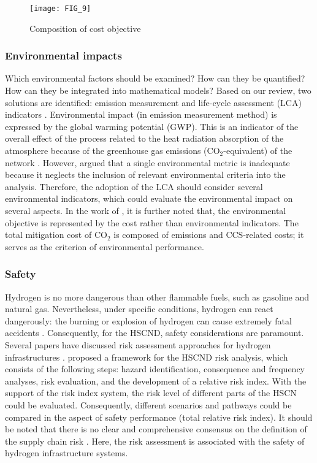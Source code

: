 \documentclass[11pt,3p]{elsarticle}
\begin{document}
\begin{figure}[!htbp]
\centering\texttt{[image: FIG\_9]}
\caption{\label{fig:CompositionCost}Composition of cost objective}
\end{figure}

\subsubsection{Environmental impacts}

Which environmental factors should be examined? How can they be quantified? How can they be integrated into mathematical models? Based on our review, two solutions are identified: emission measurement \citep{almaraz2013assessment,almaraz2014hydrogen,almaraz2015deployment,han2013multi} and life-cycle assessment (LCA) indicators \citep{guillen2010bi,sabio2012holistic}. Environmental impact (in emission measurement method) is expressed by the global warming potential (GWP). This is an indicator of the overall effect of the process related to the heat radiation absorption of the atmosphere because of the greenhouse gas emissions (CO$_{2}$-equivalent) of the network \citep{almaraz2013assessment}. However, \citet{sabio2012holistic} argued that a single environmental metric is inadequate because it neglects the inclusion of relevant environmental criteria into the analysis. Therefore, the adoption of the LCA should consider several environmental indicators, which could evaluate the environmental impact on several aspects. In the work of \citet{han2013multi}, it is further noted that, the environmental objective is represented by the cost rather than environmental indicators. The total mitigation cost of CO$_{2}$ is composed of emissions and CCS-related costs; it serves as the criterion of environmental performance. 

\subsubsection{Safety}

Hydrogen is no more dangerous than other flammable fuels, such as gasoline and natural gas. Nevertheless, under specific conditions, hydrogen can react dangerously: the burning or explosion of hydrogen can cause extremely fatal accidents \citep{kim2008strategic}. Consequently, for the HSCND, safety considerations are paramount. Several papers have discussed risk assessment approaches for hydrogen infrastructures \citep{markert2017risk,oyama2017hazid,kim2011index}. \citet{kim2008strategic} proposed a framework for the HSCND risk analysis, which consists of the following steps: hazard identification, consequence and frequency analyses, risk evaluation, and the development of a relative risk index. With the support of the risk index system, the risk level of different parts of the HSCN could be evaluated. Consequently, different scenarios and pathways could be compared in the aspect of safety performance (total relative risk index). It should be noted that there is no clear and comprehensive consensus on the definition of the supply chain risk \citep{govindan2017supply}. Here, the risk assessment is associated with the safety of hydrogen infrastructure systems.
\end{document}
